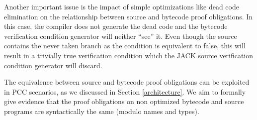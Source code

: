  Another important issue is the impact of simple optimizations like dead code elimination on the relationship between source and bytecode proof obligations. 
In this case, the compiler does not generate the dead code and the bytecode verification condition generator will neither ``see'' it. 
Even though the source contains the never taken branch as the condition is equivalent to false, this will result in a trivially true
verification condition which the JACK source verification condition generator will discard.

The equivalence between source and bytecode proof obligations can be exploited in PCC scenarios, as we discussed in Section \ref{architecture}. 
We aim to formally give evidence that the proof obligations on non optimized bytecode and source programs are syntactically the same (modulo names and types). 






%
%
%
%
%
%
%
%
%

